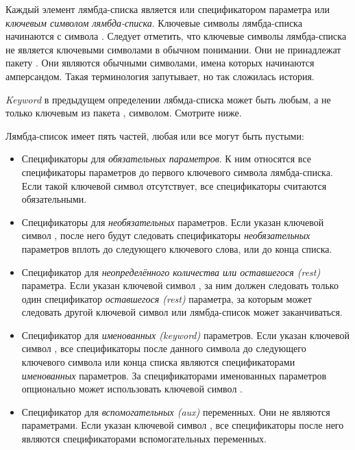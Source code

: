 Каждый элемент лямбда-списка является или спецификатором параметра или
\emph{ключевым символом лямбда-списка}. Ключевые символы лямбда-списка
начинаются с символа \cd{\&}.
Следует отметить, что ключевые символы лямбда-списка не является ключевыми
символами в обычном понимании. Они не принадлежат пакету . Они являются
обычными символами, имена которых начинаются амперсандом. Такая терминология
запутывает, но так сложилась история.

\emph{Keyword} в предыдущем определении лябмда-списка может быть любым, а не
только ключевым из пакета , символом. Смотрите ниже.

Лямбда-список имеет пять частей, любая или все могут быть пустыми:

\begin{itemize}
\item
Спецификаторы для \emph{обязательных параметров}. К ним относятся все
спецификаторы параметров до первого ключевого символа лямбда-списка. Если такой
ключевой символ отсутствует, все спецификаторы считаются обязательными.

\item
Спецификаторы для \emph{необязательных} параметров.
Если указан ключевой символ , после него будут следовать спецификаторы
\emph{необязательных} параметров вплоть до следующего ключевого слова, или до
конца списка.

\item
Спецификатор для \emph{неопределённого количества или оставшегося (rest)}
параметра. Если указан ключевой символ , за ним должен следовать
только один спецификатор \emph{оставшегося (rest)} параметра, за которым может
следовать другой ключевой символ или лямбда-список может заканчиваться.

\item
Спецификатор для \emph{именованных (keyword)} параметров. Если указан ключевой
символ , все спецификаторы после данного символа до
следующего ключевого символа или конца списка являются спецификаторами
\emph{именованных} параметров. За спецификаторами именованных параметров
опционально может использовать ключевой символ
.

\item
Спецификатор для \emph{вспомогательных (aux)} переменных. Они не являются
параметрами. Если указан ключевой символ , все
спецификаторы после него являются спецификаторами вспомогательных переменных.
\end{itemize}

